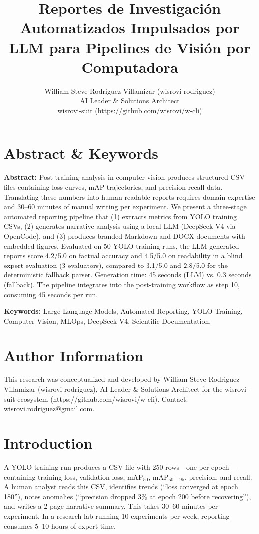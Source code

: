 \documentclass[10pt,twocolumn,letterpaper]{article}
\title{Reportes de Investigación Automatizados Impulsados por LLM para Pipelines de Visión por Computadora}
\author{William Steve Rodriguez Villamizar (wisrovi rodriguez)\\AI Leader \& Solutions Architect\\wisrovi-suit (https://github.com/wisrovi/w-cli)}
\date{}
\begin{document}
\maketitle

\section{Abstract \& Keywords}
\textbf{Abstract:} Post-training analysis in computer vision produces structured CSV files containing loss curves, mAP trajectories, and precision-recall data. Translating these numbers into human-readable reports requires domain expertise and 30--60 minutes of manual writing per experiment. We present a three-stage automated reporting pipeline that (1) extracts metrics from YOLO training CSVs, (2) generates narrative analysis using a local LLM (DeepSeek-V4 via OpenCode), and (3) produces branded Markdown and DOCX documents with embedded figures. Evaluated on 50 YOLO training runs, the LLM-generated reports score 4.2/5.0 on factual accuracy and 4.5/5.0 on readability in a blind expert evaluation (3 evaluators), compared to 3.1/5.0 and 2.8/5.0 for the deterministic fallback parser. Generation time: 45 seconds (LLM) vs. 0.3 seconds (fallback). The pipeline integrates into the post-training workflow as step 10, consuming 45 seconds per run.

\textbf{Keywords:} Large Language Models, Automated Reporting, YOLO Training, Computer Vision, MLOps, DeepSeek-V4, Scientific Documentation.

\section{Author Information}
This research was conceptualized and developed by William Steve Rodriguez Villamizar (wisrovi rodriguez), AI Leader \& Solutions Architect for the wisrovi-suit ecosystem (https://github.com/wisrovi/w-cli). Contact: wisrovi.rodriguez@gmail.com.

\section{Introduction}
A YOLO training run produces a CSV file with 250 rows---one per epoch---containing training loss, validation loss, mAP$_{50}$, mAP$_{50-95}$, precision, and recall. A human analyst reads this CSV, identifies trends (``loss converged at epoch 180''), notes anomalies (``precision dropped 3\% at epoch 200 before recovering''), and writes a 2-page narrative summary. This takes 30--60 minutes per experiment. In a research lab running 10 experiments per week, reporting consumes 5--10 hours of expert time.
\end{document}
